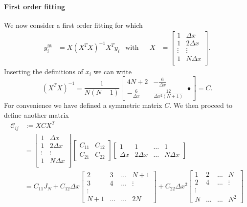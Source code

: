 \paragraph{First order fitting}
We now consider a first order fitting for which 
\begin{align}
y^{\textrm{fit}}_{i} & = X\left(X^{T}X\right)^{-1} X^{T} y_{i} & \textrm{with} && 
X & = \left[\begin{array}{cc}
1 & \Delta x \\
1 & 2 \Delta x  \\
\vdots & \vdots  \\
1 & N \Delta x  \\
\end{array}\right].
\end{align}
Inserting the definitions of $x_{i}$ we can write
\begin{equation}
\left(X^{T}X\right)^{-1} = \frac{1}{N(N-1)}\left[
\begin{array}{cc}
4N+2 & -\frac{6}{\Delta x} \\ 
 -\frac{6}{\Delta x} & \frac{12}{\Delta x^{2} (N+1)}
\end{array}•
\right] = C.
\end{equation}
For convenience we have defined a symmetric matrix $C$. We then proceed to
define another matrix
\begin{align}
    \mathcal{C}_{ij} & := XCX^{T} \\  & = 
\left[\begin{array}{cc}
1 & \Delta x \\
1 & 2\Delta x  \\
\vdots & \vdots  \\
1 & N \Delta x \\
\end{array}\right]
\left[\begin{array}{cc} C_{11} & C_{12} \\ C_{21} & C_{22} \end{array}\right]
\left[\begin{array}{cccc}
1 & 1 & \dots & 1 \\
\Delta x & 2\Delta x & \dots  & N \Delta x
\end{array}\right] \\
& = 
C_{11} J_{N} + 
C_{12} \Delta x \left[ \begin{array}{cccc} 
2 & 3 & \dots & N+1 \\ 3 & 4 & \dots & \vdots \\ \vdots & & & \\  N+1& \dots & \dots & 2N 
\end{array}\right] + 
C_{22} \Delta x^{2} \left[ \begin{array}{cccc} 
1 & 2 & \dots & N \\ 2 & 4 & \dots & \vdots \\ \vdots & & & \\  N& \dots & \dots & N^{2} 
\end{array}\right] 
\end{align}
